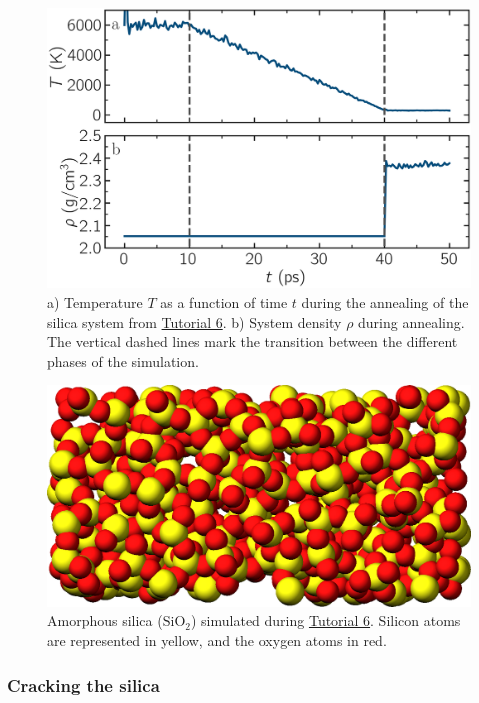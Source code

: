 \documentclass[9pt,tutorial]{livecoms}
\begin{document}
\begin{figure}
\centering
\includegraphics[width=\linewidth]{GCMC-dimension}
\caption{a) Temperature $T$ as a function of time $t$
during the annealing of the silica system
from \hyperref[gcmc-silica-label]{Tutorial 6}.
b) System density $\rho$ during
annealing.  The vertical dashed lines mark the transition between the different
phases of the simulation.}
\label{fig:GCMC-dimension}
\end{figure}

\begin{figure}
\centering
\includegraphics[width=0.9\linewidth]{GCMC-generate}
\caption{Amorphous silica ($\text{SiO}_2$) simulated
during \hyperref[gcmc-silica-label]{Tutorial 6}.  Silicon atoms are
represented in yellow, and the oxygen atoms in red.}
\label{fig:GCMC-snapshot}
\end{figure}

\subsubsection{Cracking the silica}
\end{document}
